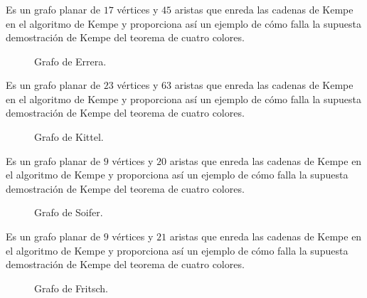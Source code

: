 \documentclass[spanish, utf8,handout]{beamer} %
\theoremstyle{definition}
\begin{document}
\begin{frame}[allowframebreaks]
\frametitle{\insertsubsection}

\begin{example}
Es un grafo planar de $17$ vértices y $45$ aristas que enreda las cadenas de Kempe en el algoritmo de Kempe y proporciona así un ejemplo de cómo falla la supuesta demostración de Kempe del teorema de cuatro colores.
\end{example}

\begin{figure}[H]
	\centering
	\scalebox{.3}{}
	\caption{Grafo de Errera.}
\end{figure}

\begin{example}
Es un grafo planar de $23$ vértices y $63$ aristas que enreda las cadenas de Kempe en el algoritmo de Kempe y proporciona así un ejemplo de cómo falla la supuesta demostración de Kempe del teorema de cuatro colores.
\end{example}

\begin{figure}[H]
	\centering
	\scalebox{.25}{}
	\caption{Grafo de Kittel.}
\end{figure}

\begin{example}
Es un grafo planar de $9$ vértices y $20$ aristas que enreda las cadenas de Kempe en el algoritmo de Kempe y proporciona así un ejemplo de cómo falla la supuesta demostración de Kempe del teorema de cuatro colores.
\end{example}

\begin{figure}[H]
	\centering
	\scalebox{0.6}{}
	\caption{Grafo de Soifer.}
\end{figure}

\begin{example}
Es un grafo planar de $9$ vértices y $21$ aristas que enreda las cadenas de Kempe en el algoritmo de Kempe y proporciona así un ejemplo de cómo falla la supuesta demostración de Kempe del teorema de cuatro colores.
\end{example}

\begin{figure}[H]
	\centering
	\scalebox{0.45}{}
	\caption{Grafo de Fritsch.}
\end{figure}



\end{frame}
\end{document}
